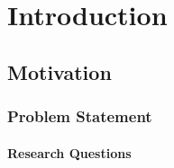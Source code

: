 
\chapter{Introduction}
\section{Motivation}
\subsection{Problem Statement}
\subsubsection{Research Questions}
